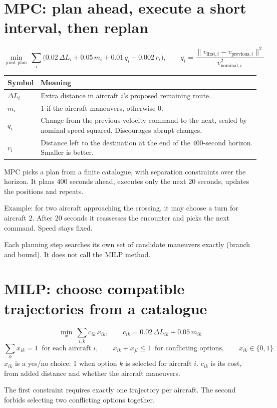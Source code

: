 \documentclass[10pt,a4paper]{article}
\begin{document}
\section{MPC: plan ahead, execute a short interval, then replan}
\[
\min_{\text{joint plan}}\ \sum_{i}\bigl(0.02\,\Delta L_i + 0.05\,m_i + 0.01\,q_i + 0.002\,r_i\bigr),
\qquad
q_i = \frac{\lVert v_{\text{first},i}-v_{\text{previous},i}\rVert^{2}}{v_{\text{nominal},i}^{2}}
\]
\begin{tabularx}{\linewidth}{@{}lX@{}}
\toprule
Symbol & Meaning\\
\midrule
$\Delta L_i$ & Extra distance in aircraft $i$'s proposed remaining route.\\
$m_i$ & 1 if the aircraft maneuvers, otherwise 0.\\
$q_i$ & Change from the previous velocity command to the next, scaled by nominal speed squared. Discourages abrupt changes.\\
$r_i$ & Distance left to the destination at the end of the 400-second horizon. Smaller is better.\\
\bottomrule
\end{tabularx}

MPC picks a plan from a finite catalogue, with separation constraints over the horizon. It plans 400 seconds ahead, executes only the next 20 seconds, updates the positions and repeats.

Example: for two aircraft approaching the crossing, it may choose a turn for aircraft 2. After 20 seconds it reassesses the encounter and picks the next command. Speed stays fixed.

Each planning step searches its own set of candidate maneuvers exactly (branch and bound). It does not call the MILP method.

\section{MILP: choose compatible trajectories from a catalogue}
\[
\min_{x}\ \sum_{i,k} c_{ik}\,x_{ik},
\qquad
c_{ik} = 0.02\,\Delta L_{ik} + 0.05\,m_{ik}
\]
\[
\sum_{k} x_{ik} = 1 \ \text{ for each aircraft } i,
\qquad
x_{ik} + x_{jl} \le 1 \ \text{ for conflicting options},
\qquad
x_{ik}\in\{0,1\}
\]
$x_{ik}$ is a yes/no choice: 1 when option $k$ is selected for aircraft $i$. $c_{ik}$ is its cost, from added distance and whether the aircraft maneuvers.

The first constraint requires exactly one trajectory per aircraft. The second forbids selecting two conflicting options together.
\end{document}
